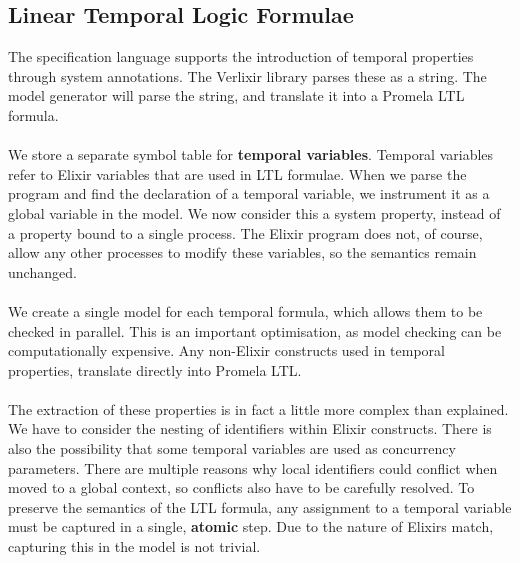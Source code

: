 \subsection{Linear Temporal Logic Formulae}
The specification language supports the introduction of temporal properties through system annotations. The Verlixir library parses these as a string. The model generator will parse the string, and translate it into a Promela LTL formula.
\\ \\
We store a separate symbol table for \textbf{temporal variables}. Temporal variables refer to Elixir variables that are used in LTL formulae. When we parse the program and find the declaration of a temporal variable, we instrument it as a global variable in the model. We now consider this a system property, instead of a property bound to a single process. The Elixir program does not, of course, allow any other processes to modify these variables, so the semantics remain unchanged.
\\ \\
We create a single model for each temporal formula, which allows them to be checked in parallel. This is an important optimisation, as model checking can be computationally expensive. Any non-Elixir constructs used in temporal properties, translate directly into Promela LTL.
\\ \\
The extraction of these properties is in fact a little more complex than explained. We have to consider the nesting of identifiers within Elixir constructs. There is also the possibility that some temporal variables are used as concurrency parameters. There are multiple reasons why local identifiers could conflict when moved to a global context, so conflicts also have to be carefully resolved. To preserve the semantics of the LTL formula, any assignment to a temporal variable must be captured in a single, \textbf{atomic} step. Due to the nature of Elixirs match, capturing this in the model is not trivial.


